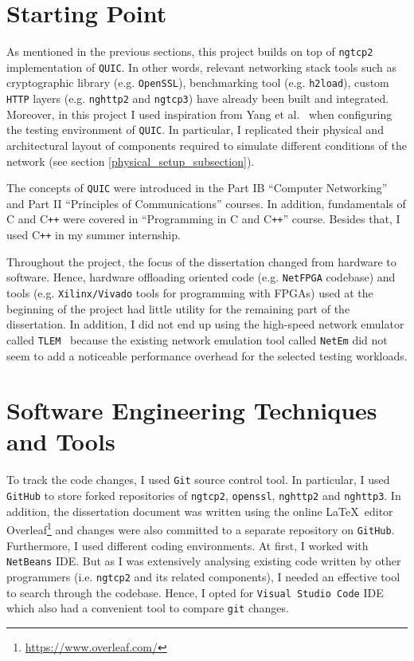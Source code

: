 \documentclass[12pt,a4paper,twoside,openright]{report}
\begin{document}
\section{Starting Point}
As mentioned in the previous sections, this project builds on top of \texttt{ngtcp2} implementation of \texttt{QUIC}.
In other words, relevant networking stack tools such as cryptographic library (e.g. \texttt{OpenSSL}), benchmarking tool (e.g. \texttt{h2load}), custom \texttt{HTTP} layers (e.g. \texttt{nghttp2} and \texttt{ngtcp3}) have already been built and integrated. 
Moreover, in this project I used inspiration from Yang et al.~\cite{Making_QUIC_Quicker} when configuring the testing environment of \texttt{QUIC}.
In particular, I replicated their physical and architectural layout of components required to simulate different conditions of the network (see section \ref{physical_setup_subsection}).

The concepts of \texttt{QUIC} were introduced in the Part IB \enquote{Computer Networking} and Part II \enquote{Principles of Communications} courses.
In addition, fundamentals of C and C\texttt{++} were covered in \enquote{Programming in C and C\texttt{++}} course. 
Besides that, I used C\texttt{++} in my summer internship.

Throughout the project, the focus of the dissertation changed from hardware to software.
Hence, hardware offloading oriented code (e.g. \texttt{NetFPGA} codebase) and tools (e.g. \texttt{Xilinx/Vivado} tools for programming with FPGAs) used at the beginning of the project had little utility for the remaining part of the dissertation.
In addition, I did not end up using the high-speed network emulator called \texttt{TLEM}~\cite{TLEM_tool} because the existing network emulation tool called \texttt{NetEm} did not seem to add a noticeable performance overhead for the selected testing workloads.


\section{Software Engineering Techniques and Tools}
    To track the code changes, I used \texttt{Git} source control tool.
    In particular, I used \texttt{GitHub} to store forked repositories of \texttt{ngtcp2}, \texttt{openssl}, \texttt{nghttp2} and \texttt{nghttp3}.
    In addition, the dissertation document was written using the online \LaTeX\  editor Overleaf\footnote{\url{https://www.overleaf.com/}} and changes were also committed to a separate repository on \texttt{GitHub}.
    Furthermore, I used different coding environments.
    At first, I worked with \texttt{NetBeans} IDE.
    But as I was extensively analysing existing code written by other programmers (i.e. \texttt{ngtcp2} and its related components), I needed an effective tool to search through the codebase.
    Hence, I opted for \texttt{Visual Studio Code} IDE which also had a convenient tool to compare \texttt{git} changes.
    
\end{document}
